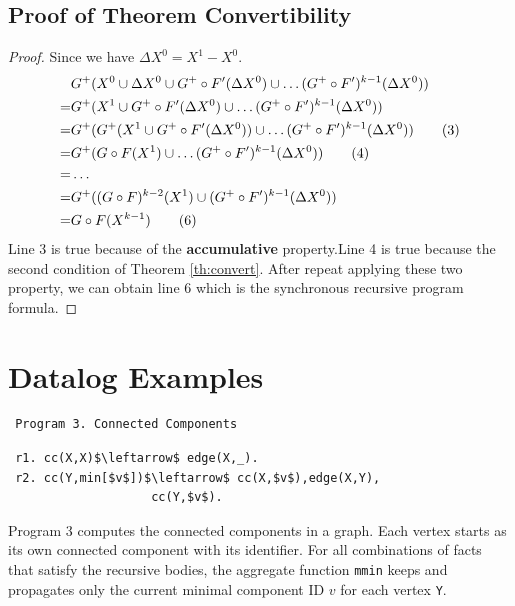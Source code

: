 \begin{appendix}
 \subsection{Proof of Theorem Convertibility}
 \label{sec:app:proof:convert}
 \begin{proof}
 Since we have $\Delta X^0=X^1-X^0$.
 \begin{align}
&G^+(X^0\cup \Delta X^0 \cup G^+\circ F'(\Delta X^0)\cup \ldots (G^+ \circ F')^{k-1}(\Delta X^0 )) \notag\\
=&G^+(X^1 \cup G^+\circ F'(\Delta X^0  )\cup \ldots (G^+ \circ F')^{k-1}(\Delta X^0  )) \notag\\
=&G^+(G^+(X^1\cup G^+\circ F'(\Delta X^0  ))\cup \ldots (G^+ \circ F')^{k-1}(\Delta X^0 )) \tag{3}\\
=&G^+(G\circ F(X^1)\cup \ldots (G^+ \circ F')^{k-1}(\Delta X^0 )) \tag{4}\\
=&\ldots \notag\\
=&G^+((G\circ F)^{k-2}(X^1)\cup(G^+ \circ F')^{k-1}(\Delta X^0 )) \notag\\
=&G\circ F(X^{k-1})\tag{6}
 \end{align}
Line 3 is true because of the \textbf{accumulative} property.Line 4 is true because the second condition of Theorem \ref{th:convert}. After repeat applying these two property, we can obtain line 6 which is the synchronous recursive program formula. 
 \end{proof}
 

 \section{Datalog Examples}
 \label{sec:app:example}
 \begin{verbatim}
 Program 3. Connected Components
 \end{verbatim}\vspace{-0.1in}\small
 \begin{lstlisting}
 r1. cc(X,X)$\leftarrow$ edge(X,_).
 r2. cc(Y,min[$v$])$\leftarrow$ cc(X,$v$),edge(X,Y),
                    cc(Y,$v$).
 \end{lstlisting}
 \normalsize
 
 Program 3 computes the connected components in a graph. Each vertex starts as its own connected component with its identifier. For all combinations of facts that satisfy the recursive bodies, the aggregate function \texttt{mmin} keeps and propagates only the current minimal component ID $v$ for each vertex \texttt{Y}.
 

\end{appendix}
